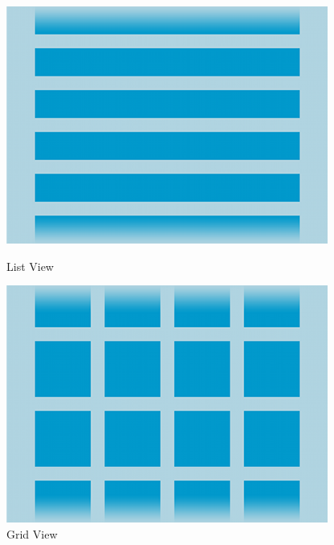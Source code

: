 \begin{figure}[H]
\centering
{}
  \includegraphics[width=\linewidth]{02-layouts/listview.png}
  \caption{List View}
\endminipage\hspace{1cm}
  \includegraphics[width=\linewidth]{02-layouts/gridview.png}
  \caption{Grid View}
\endminipage
\end{figure}


